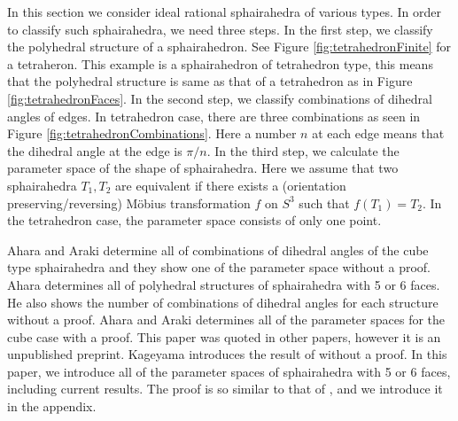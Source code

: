 \documentclass[suppldata, dvipdfmx]{interact}
\theoremstyle{plain}%
\theoremstyle{definition}
\theoremstyle{remark}
\theoremstyle{problemstyle}
\newtheorem{problem}{Problem}[section] %
\begin{document}


In this section we consider ideal rational sphairahedra of various types. 
In order to classify such sphairahedra, we need three steps.  In the first step, we classify the polyhedral structure of a sphairahedron.  See Figure \ref{fig:tetrahedronFinite} for a tetraheron.  This example is a sphairahedron of tetrahedron type, this means that the polyhedral structure is same as that of a tetrahedron as in Figure \ref{fig:tetrahedronFaces}.  
In the second step, we classify combinations of dihedral angles of edges.  In tetrahedron case, there are three combinations as seen in Figure \ref{fig:tetrahedronCombinations}.  Here a number $n$ at each edge means that the dihedral angle at the edge is $\pi / n$. 
In the third step, we calculate the parameter space of the shape of sphairahedra.  Here we assume that two sphairahedra $T_1, T_2$ are equivalent if there exists a (orientation preserving/reversing) M\"obius transformation $f$ on $S^3$ such that $f(T_1) = T_2$.  In the tetrahedron case, the parameter space consists of only one point.  

Ahara and Araki \cite{AharaAraki} determine all of combinations of dihedral angles of the cube type sphairahedra and they show one of the parameter space without a proof.  
Ahara \cite{AharaJa} determines all of polyhedral structures of sphairahedra with 5 or 6 faces.  He also shows the number of combinations of dihedral angles for each structure without a proof.  
Ahara and Araki \cite{AharaAraki2} determines all of the parameter spaces for the cube case with a proof.  This paper was quoted in other papers, however it is an unpublished preprint.
Kageyama \cite{kageyama} introduces the result of \cite{AharaAraki2} without a proof. 
In this paper, we introduce all of the parameter spaces of sphairahedra with 5 or 6 faces, including current results. The proof is so similar to that of \cite{AharaAraki2}, and we introduce it in the appendix.
\end{document}
